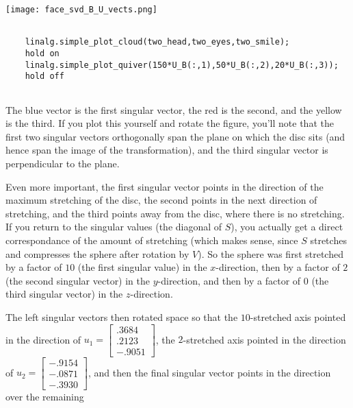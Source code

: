\documentclass{ximera}
\begin{document}
\begin{problem}
\begin{problem}
\begin{center}
  \texttt{[image: face\_svd\_B\_U\_vects.png]}
\end{center}

\begin{hint}
  \begin{verbatim}

    linalg.simple_plot_cloud(two_head,two_eyes,two_smile);
    hold on
    linalg.simple_plot_quiver(150*U_B(:,1),50*U_B(:,2),20*U_B(:,3));
    hold off
  
  \end{verbatim}
\end{hint}

The blue vector is the first singular vector, the red is the second, and the yellow is the third. If you plot this yourself and rotate the figure, you'll note that the first two singular vectors orthogonally span the plane on which the disc sits (and hence span the image of the transformation), and the third singular vector is perpendicular to the plane. 

Even more important, the first singular vector points in the direction of the maximum stretching of the disc, the second points in the next direction of stretching, and the third points away from the disc, where there is no stretching. If you return to the singular values (the diagonal of $S$), you actually get a direct correspondance of the amount of stretching (which makes sense, since $S$ stretches and compresses the sphere after rotation by $V$). So the sphere was first stretched by a factor of $10$ (the first singular value) in the $x$-direction, then by a factor of $2$ (the second singular vector) in the $y$-direction, and then by a factor of $0$ (the third singular vector) in the $z$-direction. 

The left singular vectors then rotated space so that the $10$-stretched axis pointed in the direction of $u_1=\begin{bmatrix}.3684\\.2123\\-.9051\end{bmatrix}$, the $2$-stretched axis pointed in the direction of $u_2=\begin{bmatrix}-.9154\\-.0871\\-.3930\end{bmatrix}$, and then the final singular vector points in the direction over the remaining 



\end{problem}
\end{problem}
\end{document}
